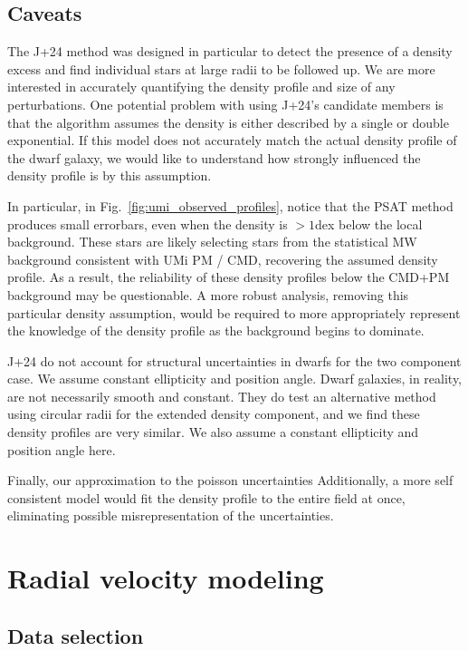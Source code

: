 \subsection{Caveats}\label{caveats}

The J+24 method was designed in particular to detect the presence of a
density excess and find individual stars at large radii to be followed
up. We are more interested in accurately quantifying the density profile
and size of any perturbations. One potential problem with using J+24's
candidate members is that the algorithm assumes the density is either
described by a single or double exponential. If this model does not
accurately match the actual density profile of the dwarf galaxy, we
would like to understand how strongly influenced the density profile is
by this assumption.

In particular, in Fig.~\ref{fig:umi_observed_profiles}, notice that the
PSAT method produces small errorbars, even when the density is \(>1\)dex
below the local background. These stars are likely selecting stars from
the statistical MW background consistent with UMi PM / CMD, recovering
the assumed density profile. As a result, the reliability of these
density profiles below the CMD+PM background may be questionable. A more
robust analysis, removing this particular density assumption, would be
required to more appropriately represent the knowledge of the density
profile as the background begins to dominate.

J+24 do not account for structural uncertainties in dwarfs for the two
component case. We assume constant ellipticity and position angle. Dwarf
galaxies, in reality, are not necessarily smooth and constant. They do
test an alternative method using circular radii for the extended density
component, and we find these density profiles are very similar. We also
assume a constant ellipticity and position angle here.

Finally, our approximation to the poisson uncertainties Additionally, a
more self consistent model would fit the density profile to the entire
field at once, eliminating possible misrepresentation of the
uncertainties.

\section{Radial velocity modeling}\label{radial-velocity-modeling}

\subsection{Data selection}\label{data-selection}

